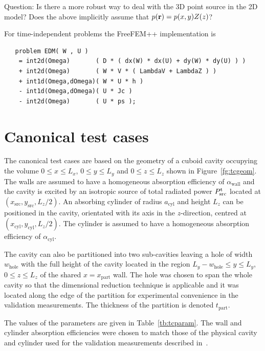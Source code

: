 \documentclass[a4paper]{article}
\numberwithin{equation}{section}
\newcounter{Table}
\newcounter{Figure}
\begin{document}
{\color{red} Question: Is there a more robust way to deal with the 3D point source in the 2D model? Does
the above implicitly assume that $p(\boldsymbol{\mathrm{r}})=p(x,y)Z(z)$?}

For time-independent problems the FreeFEM++ implementation is 
\begin{verbatim}
   problem EDM( W , U ) 
    = int2d(Omega)       ( D * ( dx(W) * dx(U) + dy(W) * dy(U) ) )
    + int2d(Omega)       ( W * V * ( LambdaV + LambdaZ ) )
    + int1d(Omega,dOmega)( W * U * h )   
    - int1d(Omega,dOmega)( U * Jc )
    - int2d(Omega)       ( U * ps );
\end{verbatim}

\section[Canonical test cases]{Canonical test cases}
\label{sc:tcs}

The canonical test cases are based on the geometry of a
cuboid cavity occupying the volume $0 \leq x \leq L_x$, $0 \leq y \leq L_y$ and 
$0 \leq z \leq L_z$ shown in Figure~\ref{fg:tcgeom}. The walls are assumed to have 
a homogeneous absorption efficiency of $\alpha_\mathrm{wall}$ and the cavity is excited
by an isotropic source of total radiated power $P^{\mathrm{t}}_\mathrm{src}$ located at 
$(x_\mathrm{src},y_\mathrm{src},L_z/2)$. An absorbing cylinder of radius $a_\mathrm{cyl}$ 
and height $L_z$ can be positioned in the cavity, orientated with its axis in the
$z$-direction, centred at $(x_\mathrm{cyl},y_\mathrm{cyl},L_z/2)$. The cylinder is assumed
to have a homogeneous absorption efficiency of $\alpha_\mathrm{cyl}$.

The cavity can also be partitioned into two sub-cavities leaving a hole of width
$w_\mathrm{hole}$ with the full height of the cavity located in the region 
$L_y-w_\mathrm{hole} \leq y \leq L_y$, $0 \leq z \leq L_z$ of the shared 
$x=x_\mathrm{part}$ wall. The hole was chosen to span the whole cavity so that the 
dimensional reduction technique is applicable and it was located along the edge of the 
partition for experimental convenience in the validation measurements.
The thickness of the partition is denoted $t_\mathrm{part}$.

The values of the parameters are given in Table~\ref{tb:tcparam}. The wall and cylinder
absorption efficiencies were chosen to match those of the physical cavity and
cylinder used for the validation measurements described in~\citep{Flintoft2017b}.
\end{document}

